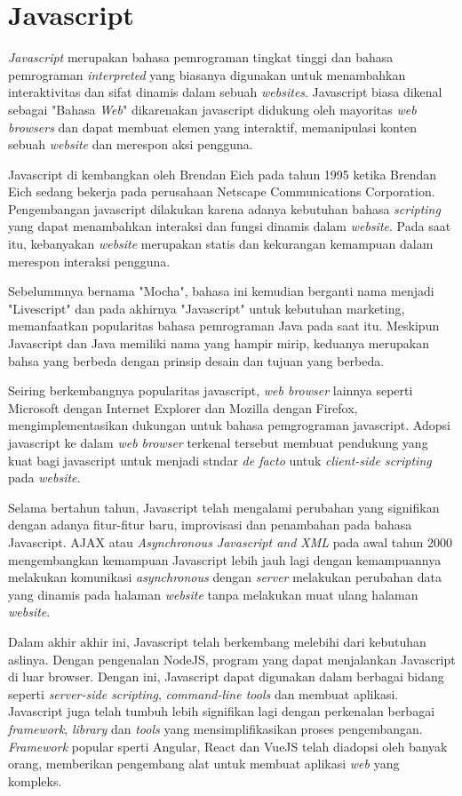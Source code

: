 \section{Javascript}
\textit{Javascript} merupakan bahasa pemrograman tingkat tinggi dan bahasa pemrograman \textit{interpreted} yang biasanya digunakan untuk menambahkan interaktivitas dan sifat dinamis dalam sebuah \textit{websites}. Javascript biasa dikenal sebagai "Bahasa \textit{Web}" dikarenakan javascript didukung oleh mayoritas \textit{web browsers} dan dapat membuat elemen yang interaktif, memanipulasi konten sebuah \textit{website} dan merespon aksi pengguna.

Javascript di kembangkan oleh Brendan Eich pada tahun 1995 ketika Brendan Eich sedang bekerja pada perusahaan Netscape Communications Corporation. Pengembangan javascript dilakukan karena adanya kebutuhan bahasa \textit{scripting} yang dapat menambahkan interaksi dan fungsi dinamis dalam \textit{website}. Pada saat itu, kebanyakan \textit{website} merupakan statis dan kekurangan kemampuan dalam merespon interaksi pengguna.

Sebelummnya bernama "Mocha", bahasa ini kemudian berganti nama menjadi "Livescript" dan pada akhirnya "Javascript" untuk kebutuhan marketing, memanfaatkan popularitas bahasa pemrograman Java pada saat itu. Meskipun Javascript dan Java memiliki nama yang hampir mirip, keduanya merupakan bahsa yang berbeda dengan prinsip desain dan tujuan yang berbeda.

Seiring berkembangnya popularitas javascript, \textit{web browser} lainnya seperti Microsoft dengan Internet Explorer dan Mozilla dengan Firefox, mengimplementasikan dukungan untuk bahasa pemgrograman javascript. Adopsi javascript ke dalam \textit{web browser} terkenal tersebut membuat pendukung yang kuat bagi javascript untuk menjadi stndar \textit{de facto} untuk \textit{client-side scripting} pada \textit{website}.

Selama bertahun tahun, Javascript telah mengalami perubahan yang signifikan dengan adanya fitur-fitur baru, improvisasi dan penambahan pada bahasa Javascript. AJAX atau \textit{Asynchronous Javascript and XML} pada awal tahun 2000 mengembangkan kemampuan Javascript lebih jauh lagi dengan kemampuannya melakukan komunikasi \textit{asynchronous} dengan \textit{server} melakukan perubahan data yang dinamis pada halaman \textit{website} tanpa melakukan muat ulang halaman \textit{website}.

Dalam akhir akhir ini, Javascript telah berkembang melebihi dari kebutuhan aslinya. Dengan pengenalan NodeJS, program yang dapat menjalankan Javascript di luar browser. Dengan ini, Javascript dapat digunakan dalam berbagai bidang seperti \textit{server-side scripting}, \textit{command-line tools} dan membuat aplikasi. Javascript juga telah tumbuh lebih signifikan lagi dengan perkenalan berbagai \textit{framework}, \textit{library} dan \textit{tools} yang mensimplifikasikan proses pengembangan. \textit{Framework} popular sperti Angular, React dan VueJS telah diadopsi oleh banyak orang, memberikan pengembang alat untuk membuat aplikasi \textit{web} yang kompleks.


